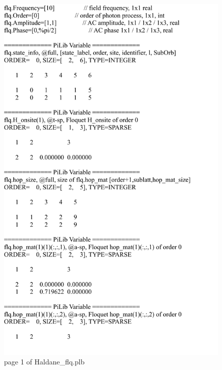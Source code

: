 \documentclass[10pt,a4paper]{article}
\begin{document}
\begin{figure}[tbp]
\centering
\includegraphics[width=0.85\columnwidth]{Haldane_flq_p1.pdf}
\caption{page 1 of Haldane\_flq.plb}
\end{figure}
\end{document}
